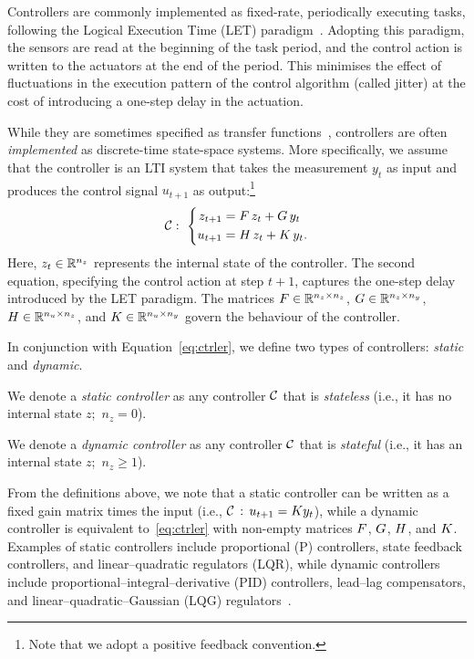 Controllers are commonly implemented as fixed-rate, periodically executing tasks, following the Logical Execution Time (LET) paradigm~\cite{Henzinger:2003,Kirsch:2012, Ernst:2018}.
Adopting this paradigm, the sensors are read at the beginning of the task period, and the control action is written to the actuators at the end of the period. 
This minimises the effect of fluctuations in the execution pattern of the control algorithm (called jitter) at the cost of introducing a one-step delay in the actuation.

While they are sometimes specified as transfer functions~\cite{Astrom:2008}, controllers are often \emph{implemented} as discrete-time state-space systems.
More specifically, we assume that the controller is an LTI system that takes the measurement $y_t$ as input and produces the control signal $u_{t+1}$ as output:\footnote{Note that we adopt a positive feedback convention.}
\begin{equation}
    \label{eq:ctrler}
    \ctrler: \,\, \left\{
    \begin{aligned}
        z_{t+1} &= \Ac\,z_t + \Bc\,y_t \\
        u_{t+1} &= \Cc\,z_{t} + \Dc\,y_t.
    \end{aligned}
    \right.
\end{equation}
Here, $z_t \in \mathbb{R}^{n_z}$ represents the internal state of the controller.
The second equation, specifying the control action at step $t+1$, captures the one-step delay introduced by the LET paradigm.
The matrices $F \in \mathbb{R}^{n_z \times n_z}$, $G \in \mathbb{R}^{n_z \times n_y}$, $H \in \mathbb{R}^{n_u \times n_z}$, and $K \in \mathbb{R}^{n_u \times n_y}$ govern the behaviour of the controller.

In conjunction with Equation~\eqref{eq:ctrler}, we define two types of controllers: \emph{static} and \emph{dynamic}.

\begin{definition}%
    We denote a \emph{static controller} as any controller $\mathcal{C}$ that is \emph{stateless} (i.e., it has no internal state $z$;\, $n_z = 0$).
\end{definition}

\begin{definition}%
    We denote a \emph{dynamic controller} as any controller $\mathcal{C}$ that is \emph{stateful} (i.e., it has an internal state $z$;\, $n_z\geq 1$).
\end{definition}

From the definitions above, we note that a static controller can be written as a fixed gain matrix times the input (i.e., $\mathcal{C} \,:\, u_{t+1} = K y_t$), while a dynamic controller is equivalent to~\eqref{eq:ctrler} with non-empty matrices $F$, $G$, $H$, and $K$.
Examples of static controllers include proportional (P) controllers, state feedback controllers, and linear--quadratic regulators (LQR), while dynamic controllers include proportional--integral--derivative (PID) controllers, lead--lag compensators, and linear--quadratic--Gaussian (LQG) regulators~\cite{Astrom:2008}.

